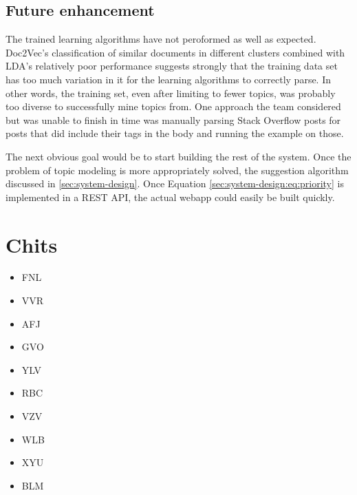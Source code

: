 \subsection{Future enhancement}
The trained learning algorithms have not peroformed as well as
expected.
Doc2Vec’s classification of similar documents in different clusters combined with LDA’s relatively poor performance suggests strongly that the training data set has too much variation in it for the learning algorithms to correctly parse.  In other words, the training set, even after limiting to fewer topics, was probably too diverse to successfully mine topics from.
One approach the team considered but was unable to finish in time was
manually parsing Stack Overflow posts for posts that did include their
tags in the body and running the example on those.  

The next obvious goal would be to start building the rest of the
system.
Once the problem of topic modeling is more appropriately solved, the
suggestion algorithm discussed in \ref{sec:system-design}.
Once Equation \ref{sec:system-design:eq:priority} is implemented in a REST API, the
actual webapp could easily be built quickly.  

\section{Chits}
\begin{itemize}
\item FNL
\item VVR
\item AFJ
\item GVO
\item YLV
\item RBC
\item VZV
\item WLB
\item XYU
\item BLM
\end{itemize}


 